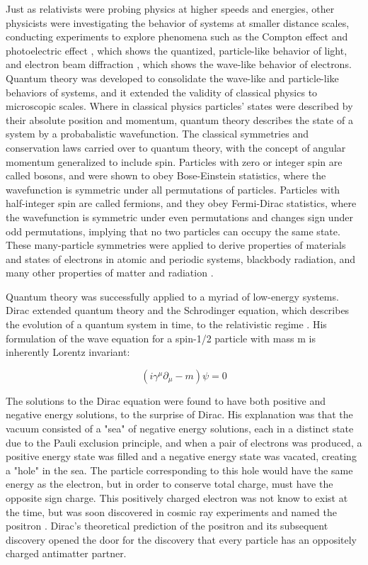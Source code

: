 \indent Just as relativists were probing physics at higher speeds and energies, other physicists were investigating the behavior of systems at smaller distance scales, conducting experiments to explore phenomena such as the Compton effect \cite{PhysRev.21.483} and photoelectric effect \cite{Einstein:1905cc}, which shows the quantized, particle-like behavior of light, and electron beam diffraction \cite{Davisson:1927ta}, which shows the wave-like behavior of electrons. Quantum theory was developed to consolidate the wave-like and particle-like behaviors of systems, and it extended the validity of classical physics to microscopic scales. Where in classical physics particles' states were described by their absolute position and momentum, quantum theory describes the state of a system by a probabalistic wavefunction. The classical symmetries and conservation laws carried over to quantum theory, with the concept of angular momentum generalized to include spin. Particles with zero or integer spin are called bosons, and were shown to obey Bose-Einstein statistics, where the wavefunction is symmetric under all permutations of particles. Particles with half-integer spin are called fermions, and they obey Fermi-Dirac statistics, where the wavefunction is symmetric under even permutations and changes sign under odd permutations, implying that no two particles can occupy the same state. These many-particle symmetries were applied to derive properties of materials and states of electrons in atomic and periodic systems, blackbody radiation, and many other properties of matter and radiation \cite{Shankar}.

\indent Quantum theory was successfully applied to a myriad of low-energy systems. Dirac extended quantum theory and the Schrodinger equation, which describes the evolution of a quantum system in time, to the relativistic regime \cite{Diracqm}. His formulation of the wave equation for a spin-1/2 particle with mass m is inherently Lorentz invariant:

\begin{equation}
(i \gamma^\mu \partial_\mu - m)\psi = 0
\end{equation}

The solutions to the Dirac equation were found to have both positive and negative energy solutions, to the surprise of Dirac. His explanation was that the vacuum consisted of a "sea" of negative energy solutions, each in a distinct state due to the Pauli exclusion principle, and when a pair of electrons was produced, a positive energy state was filled and a negative energy state was vacated, creating a "hole" in the sea. The particle corresponding to this hole would have the same energy as the electron, but in order to conserve total charge, must have the opposite sign charge. This positively charged electron was not know to exist at the time, but was soon discovered in cosmic ray experiments and named the positron \cite{PhysRev.43.491}. Dirac's theoretical prediction of the positron and its subsequent discovery opened the door for the discovery that every particle has an oppositely charged antimatter partner. 

